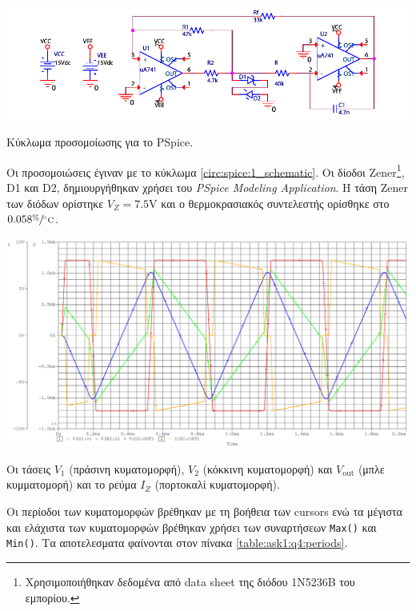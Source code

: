 \begin{center}
	\begin{circuitfig}[H]
		\includegraphics[width=15cm]{spice_01/schematic.pdf}
		\caption{Κύκλωμα προσομοίωσης για το PSpice.}
		\label{circ:spice:1_schematic}
	\end{circuitfig}
\end{center}
\vspace*{-10pt}

Οι προσομοιώσεις έγιναν με το κύκλωμα \ref{circ:spice:1_schematic}. Οι δίοδοι Zener\footnote{Χρησιμοποιήθηκαν δεδομένα από data sheet της διόδου 1N5236B του εμπορίου.}, D1 και D2, δημιουργήθηκαν χρήσει του \textsl{PSpice Modeling Application}. Η τάση Zener των διόδων ορίστηκε $V_Z=7.5\unit{\volt}$ και ο θερμοκρασιακός συντελεστής ορίσθηκε στο $0.058\displaystyle{\sfrac{\%}{\unit{\celsius}}}$.

\begin{chart}[H]
	\begin{center}
		\includegraphics[width=15cm]{spice_01/q4cropped.pdf}
		\caption{Οι τάσεις $V_1$ (πράσινη κυματομορφή), $V_2$ (κόκκινη κυματομορφή) και $V_{\mathrm{out}}$ (μπλε κυμματομορή) και το ρεύμα $I_Z$ (πορτοκαλί κυματομορφή).}
		\label{plot:ask1:q4}
	\end{center}
\end{chart}

Οι περίοδοι των κυματομορφών βρέθηκαν με τη βοήθεια των cursors ενώ τα μέγιστα και ελάχιστα των κυματομορφών βρέθηκαν χρήσει των συναρτήσεων \texttt{Max()} και \texttt{Min()}. Τα αποτελεσματα φαίνονται στον πίνακα \ref{table:ask1:q4:periods}.

